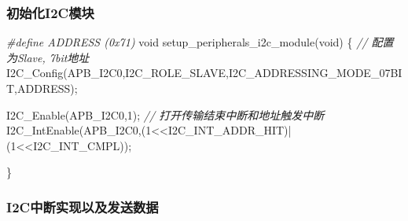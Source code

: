 \documentclass[
  12pt,
]{book}
\newenvironment{Shaded}{\begin{snugshade}}{\end{snugshade}}
\newcommand{\CommentTok}[1]{\textcolor[rgb]{0.56,0.35,0.01}{\textit{#1}}}
\newcommand{\DataTypeTok}[1]{\textcolor[rgb]{0.13,0.29,0.53}{#1}}
\newcommand{\DecValTok}[1]{\textcolor[rgb]{0.00,0.00,0.81}{#1}}
\newcommand{\NormalTok}[1]{#1}
\newcommand{\PreprocessorTok}[1]{\textcolor[rgb]{0.56,0.35,0.01}{\textit{#1}}}
\begin{document}
\hypertarget{ux521dux59cbux5316i2cux6a21ux5757-9}{%
\subsubsection{初始化I2C模块}\label{ux521dux59cbux5316i2cux6a21ux5757-9}}

\begin{Shaded}
\begin{Highlighting}[]
\PreprocessorTok{#define ADDRESS (0x71)}
\DataTypeTok{void}\NormalTok{ setup_peripherals_i2c_module(}\DataTypeTok{void}\NormalTok{)}
\NormalTok{\{}
  \CommentTok{// 配置为Slave, 7bit地址}
\NormalTok{  I2C_Config(APB_I2C0,I2C_ROLE_SLAVE,I2C_ADDRESSING_MODE_07BIT,ADDRESS);}
  
\NormalTok{  I2C_Enable(APB_I2C0,}\DecValTok{1}\NormalTok{);}
  \CommentTok{// 打开传输结束中断和地址触发中断}
\NormalTok{  I2C_IntEnable(APB_I2C0,(}\DecValTok{1}\NormalTok{<<I2C_INT_ADDR_HIT)|(}\DecValTok{1}\NormalTok{<<I2C_INT_CMPL));}

\NormalTok{\}}
\end{Highlighting}
\end{Shaded}

\hypertarget{i2cux4e2dux65adux5b9eux73b0ux4ee5ux53caux53d1ux9001ux6570ux636e-4}{%
\subsubsection{I2C中断实现以及发送数据}\label{i2cux4e2dux65adux5b9eux73b0ux4ee5ux53caux53d1ux9001ux6570ux636e-4}}
\end{document}
